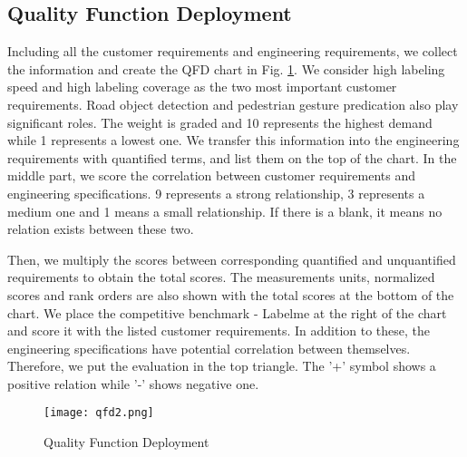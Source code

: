 \subsection{Quality Function Deployment}
Including all the customer requirements and engineering requirements, we collect the information and create the QFD chart in Fig. \ref{fig:qfd}. We consider high labeling speed and high labeling coverage as the two most important customer requirements. Road object detection and pedestrian gesture predication also play significant roles. The weight is graded and 10 represents the highest demand while 1 represents a lowest one. We transfer this information into the engineering requirements with quantified terms, and list them on the top of the chart. In the middle part, we score the correlation between customer requirements and engineering specifications. 9 represents a strong relationship, 3 represents a medium one and 1 means a small relationship. If there is a blank, it means no relation exists between these two.

Then, we multiply the scores between corresponding quantified and unquantified requirements to obtain the total scores. The measurements units, normalized scores and rank orders are also shown with the total scores at the bottom of the chart. We place the competitive benchmark - Labelme at the right of the chart and score it with the listed customer requirements. In addition to these, the engineering specifications have potential correlation between themselves. Therefore, we put the evaluation in the top triangle. The '+' symbol shows a positive relation while '-' shows negative one. 
\begin{figure}[htbp]
  \centering \texttt{[image: qfd2.png]} %
  \caption{Quality Function Deployment}
  \label{fig:qfd}
\end{figure}


